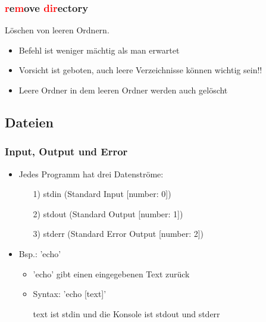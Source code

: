 \documentclass[12pt,utf8, handout]{beamer}
\begin{document}
\begin{frame}
\frametitle{\textcolor{red}{r}e\textcolor{red}{m}ove \textcolor{red}{dir}ectory}
Löschen von leeren Ordnern.
\begin{itemize}
	\item Befehl ist weniger mächtig als man erwartet
	\item Vorsicht ist geboten, auch leere Verzeichnisse können wichtig sein!!
	\item Leere Ordner in dem leeren Ordner werden auch gelöscht
\end{itemize}
\end{frame}

\subsection{Dateien}
\begin{frame}
\frametitle{Input, Output und Error}
\begin{itemize}
	\item Jedes Programm hat drei Datenströme:
	\begin{itemize}
		\item[1)] stdin (Standard Input [number: 0])
		\item[2)] stdout (Standard Output [number: 1])
		\item[3)] stderr (Standard Error Output [number: 2])
	\end{itemize}
	\item Bsp.: 'echo'
	\begin{itemize}[<+->]
		\item 'echo' gibt einen eingegebenen Text zurück
		\item Syntax: 'echo [text]'
		\item [text] ist stdin und die Konsole ist stdout und stderr
	\end{itemize}
\end{itemize}
\end{frame}
\end{document}
